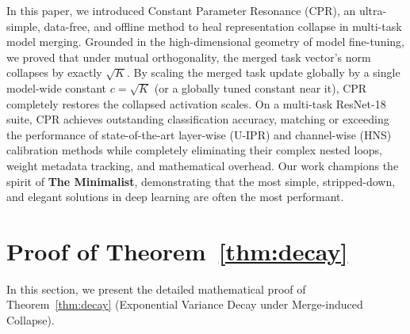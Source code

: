 \documentclass{article}
\theoremstyle{plain}
\theoremstyle{definition}
\theoremstyle{remark}
\begin{document}
In this paper, we introduced Constant Parameter Resonance (CPR), an ultra-simple, data-free, and offline method to heal representation collapse in multi-task model merging. Grounded in the high-dimensional geometry of model fine-tuning, we proved that under mutual orthogonality, the merged task vector's norm collapses by exactly $\sqrt{K}$. By scaling the merged task update globally by a single model-wide constant $c = \sqrt{K}$ (or a globally tuned constant near it), CPR completely restores the collapsed activation scales. On a multi-task ResNet-18 suite, CPR achieves outstanding classification accuracy, matching or exceeding the performance of state-of-the-art layer-wise (U-IPR) and channel-wise (HNS) calibration methods while completely eliminating their complex nested loops, weight metadata tracking, and mathematical overhead. Our work champions the spirit of \textbf{The Minimalist}, demonstrating that the most simple, stripped-down, and elegant solutions in deep learning are often the most performant.




\newpage
\appendix
\onecolumn
\section{Proof of Theorem~\ref{thm:decay}}
\label{app:proof}

In this section, we present the detailed mathematical proof of Theorem~\ref{thm:decay} (Exponential Variance Decay under Merge-induced Collapse).
\end{document}
